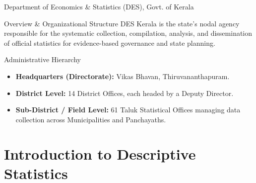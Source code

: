 \documentclass[10pt, aspectratio=169]{beamer}
\begin{document}
\begin{frame}{Department of Economics \& Statistics (DES), Govt. of Kerala}
    \begin{block}{Overview \& Organizational Structure}
        DES Kerala is the state's nodal agency responsible for the systematic collection, compilation, analysis, and dissemination of official statistics for evidence-based governance and state planning.
    \end{block}

    \begin{block}{Administrative Hierarchy}
        \begin{itemize}
            \item \textbf{Headquarters (Directorate):} Vikas Bhavan, Thiruvananthapuram.
            \item \textbf{District Level:} 14 District Offices, each headed by a Deputy Director.
            \item \textbf{Sub-District / Field Level:} 61 Taluk Statistical Offices managing data collection across Municipalities and Panchayaths.
        \end{itemize}
    \end{block}
\end{frame}

\section{Introduction to Descriptive Statistics}
\end{document}

